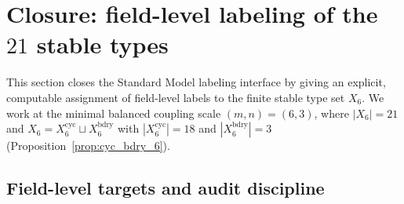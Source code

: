 \section{Closure: field-level labeling of the \texorpdfstring{$21$}{21} stable types}
\label{sec:sm_labeling_closure}

This section closes the Standard Model labeling interface by giving an explicit, computable assignment of field-level labels to the finite stable type set $X_6$.
We work at the minimal balanced coupling scale $(m,n)=(6,3)$, where $|X_6|=21$ and $X_6=X_6^{\mathrm{cyc}}\sqcup X_6^{\mathrm{bdry}}$ with $|X_6^{\mathrm{cyc}}|=18$ and $|X_6^{\mathrm{bdry}}|=3$ (Proposition~\ref{prop:cyc_bdry_6}).

\subsection{Field-level targets and audit discipline}
\label{subsec:sm_labeling_targets}

